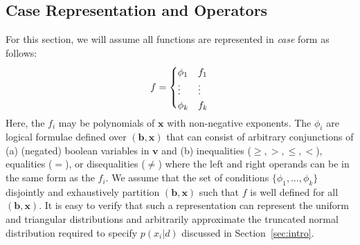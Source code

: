 \documentclass[letterpaper]{article}
\renewcommand{\vec}[1]{\mathbf{#1}}
\begin{document}
\subsection{Case Representation and Operators}

For this section, we will assume all functions
are represented in \emph{case} form as follows:
\vspace{-5mm}
{%
\begin{align}
f = 
\begin{cases}
  \phi_1 & f_1 \\ 
  \vdots & \vdots \\ 
  \phi_k & f_k \\ 
  \vspace{-6mm}
\end{cases} \label{eq:case}
\end{align}
} 
Here, the $f_i$ may be polynomials of $\vec{x}$ with non-negative
exponents.  The $\phi_i$ are logical formulae defined over
$(\vec{b},\vec{x})$ that can consist of arbitrary conjunctions of (a)
(negated) boolean variables in $\vec{v}$ and (b) inequalities
($\geq,>,\leq,<$), equalities ($=$), or disequalities ($\neq$) where
the left and right operands can be in the same form as the $f_i$.  We
assume that the set of conditions $\{ \phi_1,\ldots,\phi_k \}$ 
disjointly and exhaustively partition $(\vec{b},\vec{x})$ such that $f$
is well defined for all $(\vec{b},\vec{x})$.  It is easy to verify
that such a representation can represent the uniform and triangular
distributions and arbitrarily approximate the truncated normal 
distribution required to specify $p(x_i|d)$ discussed in 
Section~\ref{sec:intro}.

\end{document}
